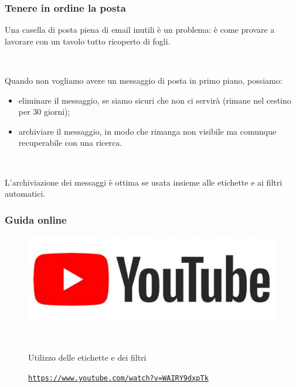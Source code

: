 \documentclass[handout]{beamer}
\begin{document}
\begin{frame}
\frametitle{Tenere in ordine la posta}
Una casella di posta piena di email inutili è un problema: è come provare a lavorare con un tavolo tutto ricoperto di fogli.\pause

~

Quando non vogliamo avere un messaggio di posta in primo piano, possiamo:
\begin{itemize}
  \item \alert{eliminare il messaggio}, se siamo sicuri che non ci servirà (rimane nel cestino per 30 giorni);\pause
  \item \alert{archiviare il messaggio}, in modo che rimanga non visibile ma comunque recuperabile con una ricerca.\pause
\end{itemize}

~

L'archiviazione dei messaggi è ottima se usata insieme alle \alert{etichette} e ai \alert{filtri automatici}.
\end{frame}



\begin{frame}
\frametitle{Guida online}
\begin{figure}
  \includegraphics[width=.5\columnwidth]{img/ytlogo.jpg}
  
  ~
  
  Utilizzo delle etichette e dei filtri
  
  \href{https://www.youtube.com/watch?v=WAIRY9dxpTk}{\texttt{https://www.youtube.com/watch?v=WAIRY9dxpTk}}
\end{figure}
\end{frame}
\end{document}
